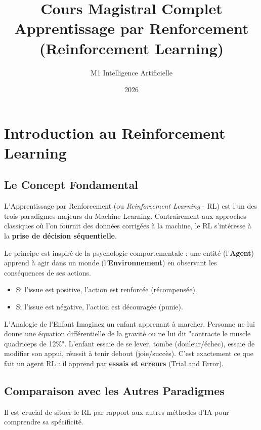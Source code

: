 \documentclass[a4paper,12pt]{report}
\title{\textbf{Cours Magistral Complet}\\Apprentissage par Renforcement (Reinforcement Learning)}
\author{M1 Intelligence Artificielle}
\date{2026}
\begin{document}
\maketitle
\tableofcontents
\newpage

\chapter{Introduction au Reinforcement Learning}

\section{Le Concept Fondamental}
L'Apprentissage par Renforcement (ou \textit{Reinforcement Learning} - RL) est l'un des trois paradigmes majeurs du Machine Learning. Contrairement aux approches classiques où l'on fournit des données corrigées à la machine, le RL s'intéresse à la \textbf{prise de décision séquentielle}.

Le principe est inspiré de la psychologie comportementale : une entité (l'\textbf{Agent}) apprend à agir dans un monde (l'\textbf{Environnement}) en observant les conséquences de ses actions.
\begin{itemize}
    \item Si l'issue est positive, l'action est renforcée (récompensée).
    \item Si l'issue est négative, l'action est découragée (punie).
\end{itemize}

\begin{intuition}{L'Analogie de l'Enfant}
Imaginez un enfant apprenant à marcher. Personne ne lui donne une équation différentielle de la gravité ou ne lui dit "contracte le muscle quadriceps de 12\%". L'enfant essaie de se lever, tombe (douleur/échec), essaie de modifier son appui, réussit à tenir debout (joie/succès).
C'est exactement ce que fait un agent RL : il apprend par \textbf{essais et erreurs} (Trial and Error).
\end{intuition}

\section{Comparaison avec les Autres Paradigmes}
Il est crucial de situer le RL par rapport aux autres méthodes d'IA pour comprendre sa spécificité.
\end{document}
